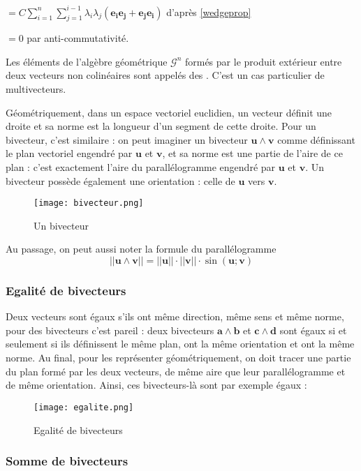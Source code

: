 $= C\sum_{i=1}^n \sum_{j=1}^{i-1} \lambda_i\lambda_j (\bm{e_i} \bm{e_j} + \bm{e_j} \bm{e_i})$ d'après \ref{wedgeprop}

$= 0 $ par anti-commutativité.

Les éléments de l'algèbre géométrique $\mathscr{G}^n$ formés par le produit extérieur entre deux vecteurs non colinéaires sont appelés des . C'est un cas particulier de multivecteurs. 

Géométriquement, dans un espace vectoriel euclidien, un vecteur définit une droite et sa norme est la longueur d'un segment de cette droite. Pour un bivecteur, c'est similaire :  on peut imaginer un bivecteur $\bm{u} \wedge \bm{v}$ comme définissant le plan vectoriel engendré par $\bm{u}$ et $\bm{v}$, et sa norme est une partie de l'aire de ce plan : c'est exactement l'aire du parallélogramme engendré par $\bm{u}$ et $\bm{v}$. Un bivecteur possède également une orientation : celle de $\bm{u}$ vers $\bm{v}$.

\begin{figure}[!ht]
\centering
\texttt{[image: bivecteur.png]}
\caption{Un bivecteur}
\label{bivecteur}
\end{figure}

Au passage, on peut aussi noter la formule du parallélogramme $$||\bm{u} \wedge \bm{v}|| = ||\bm{u}||\cdot||\bm{v}||\cdot \sin (\bm{u};\bm{v})$$

\subsubsection{Egalité de bivecteurs}

Deux vecteurs sont égaux s'ils ont même direction, même sens et même norme, pour des bivecteurs c'est pareil : deux bivecteurs $\bm{a}\wedge\bm{b}$ et $\bm{c}\wedge\bm{d}$ sont égaux si et seulement si ils définissent le même plan, ont la même orientation et ont la même norme. Au final, pour les représenter géométriquement, on doit tracer une partie du plan formé par les deux vecteurs, de même aire que leur parallélogramme et de même orientation. Ainsi, ces bivecteurs-là sont par exemple égaux : 

\begin{figure}[!ht]
\centering
\texttt{[image: egalite.png]}
\caption{Egalité de bivecteurs}
\label{egalite}
\end{figure}

\subsubsection{Somme de bivecteurs}


